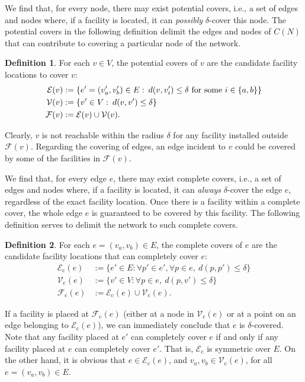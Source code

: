 \documentclass[review]{elsarticle}
\newcommand{\cF}{{\mathcal F}}
\newcommand{\cE}{{\mathcal E}}
\newcommand{\cV}{{\mathcal V}}
\newcommand{\dlt}{{\delta}}
\theoremstyle{definition}
\newtheorem{definition}{Definition}[section]
\begin{document}
We find that, for every node, there may exist potential covers, i.e., a set of edges and nodes where, if a facility is located, it can \textit{possibly} $\dlt$-cover this node.  The potential covers in the following definition delimit the edges and nodes of $C(N)$ that can contribute to covering a particular node of the network.
\begin{definition}\label{defa.linksetsv}
For each $v \in V$, the potential covers of $v$ are the candidate facility locations to cover $v$:
\begin{align}
 \cE(v)&:= \{e'=(v'_a,v'_b) \in E:\:   d(v,v'_{i}) \le \dlt \textup{ for some } i\in \{a,b\} \} \nonumber\\
 \cV(v)&:= \{v' \in V: \:  d(v,v') \le \dlt\} \nonumber\\
 \cF(v)&:= \cE(v) \cup \cV(v). \nonumber
\end{align}
\end{definition}
Clearly, $v$ is not reachable within the radius $\dlt$ for any facility installed outside $\cF(v)$. Regarding the covering of edges, an edge incident to $v$ could be covered by some of the facilities in $\cF(v)$.

We find that, for every edge $e$, there may exist complete covers, i.e., a set of edges and nodes where, if a facility is located, it can \textit{always} $\dlt$-cover the edge $e$, regardless of the exact facility location. Once there is a facility within a complete cover, the whole edge $e$ is guaranteed to be covered by this facility. The following definition serves to delimit the network to such complete covers.

\begin{definition}
\label{def.linksetse}
For each $e=(v_{a}, v_{b}) \in E$, the  complete covers of $e$ are the candidate facility locations that can completely cover $e$:
\begin{align}
\cE_{\mathrm{c}}(e)& :=\{e' \in E:   \forall p' \in e', \forall  p \in e,\:   d(p,p') \le \dlt\}\nonumber\\
   \cV_{\mathrm{c}}(e)&:= \{v' \in V:   \forall  p \in e,\: d(p,v') \le \dlt \}\nonumber\\
  \cF_{\mathrm{c}}(e) &:= \cE_{\mathrm{c}}(e) \cup \cV_{\mathrm{c}}(e).
\end{align}
\end{definition}
If a facility is placed at $\cF_{\mathrm{c}}(e)$ (either at a node in $\cV_{\mathrm{c}}(e)$ or at a point on an edge belonging to $\cE_{\mathrm{c}}(e)$), we can immediately conclude that $e$ is $\dlt$-covered.
Note that any facility placed at $e'$ can completely cover $e$ if and only if any facility placed at $e$ can completely cover $e'$. That is,  $\cE_{\mathrm{c}}$ is symmetric over $E$. On the other hand, it is obvious that $e\in \cE_{\mathrm{c}}(e)$,  and $v_{a} ,v_{b}\in \cV_{\mathrm{c}}(e)$, for all $e=(v_a,v_b)\in E$.
\end{document}
